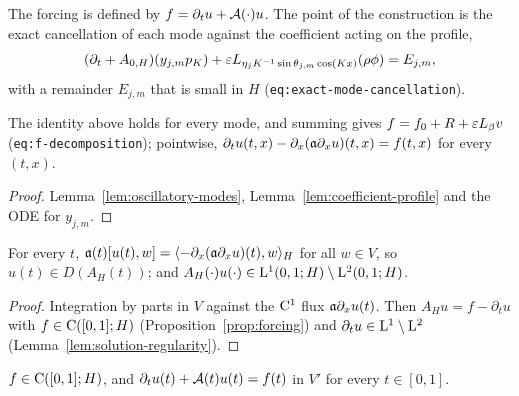 The forcing is defined by $f=\partial_tu+\mathcal{A}(\cdot)u$.  The point of the construction is the exact
cancellation of each mode against the coefficient acting on the profile,
\[
  (\partial_t+A_{0,H})(y_{j,m}p_K)+\varepsilon L_{\eta_jK^{-1}\sin\theta_{j,m}\cos(Kx)}(\rho\phi)=E_{j,m},
\]
with a remainder $E_{j,m}$ that is small in $H$ (\texttt{eq:exact-mode-cancellation}).

\begin{lemma}
  \label{lem:cancellation}
  \leanok
  The identity above holds for every mode, and summing gives
  $f=f_0+R+\varepsilon L_{\beta}v$ (\texttt{eq:f-decomposition}); pointwise,
  $\partial_tu(t,x)-\partial_x(\mathfrak{a}\partial_xu)(t,x)=f(t,x)$ for every $(t,x)$.
\end{lemma}

\begin{proof}
  \leanok
  Lemma~\ref{lem:oscillatory-modes}, Lemma~\ref{lem:coefficient-profile} and the ODE for $y_{j,m}$.
\end{proof}

\begin{lemma}
  \label{lem:domain-membership}
  \leanok
  For every $t$, $\mathfrak{a}(t)[u(t),w]=\langle-\partial_x(\mathfrak{a}\partial_xu)(t),w\rangle_H$ for all $w\in V$, so
  $u(t)\in D(A_H(t))$; and $A_H(\cdot)u(\cdot)\in\mathrm{L}^1(0,1;H)\setminus\mathrm{L}^2(0,1;H)$.
\end{lemma}

\begin{proof}
  \leanok
  Integration by parts in $V$ against the $\mathrm{C}^1$ flux $\mathfrak{a}\partial_xu(t)$.  Then
  $A_Hu=f-\partial_tu$ with $f\in\mathrm{C}([0,1];H)$ (Proposition~\ref{prop:forcing}) and
  $\partial_tu\in\mathrm{L}^1\setminus\mathrm{L}^2$ (Lemma~\ref{lem:solution-regularity}).
\end{proof}

\begin{proposition}
  \label{prop:forcing}
  \leanok
  $f\in\mathrm{C}([0,1];H)$, and $\partial_tu(t)+\mathcal{A}(t)u(t)=f(t)$ in $V'$ for every $t\in[0,1]$.
\end{proposition}

